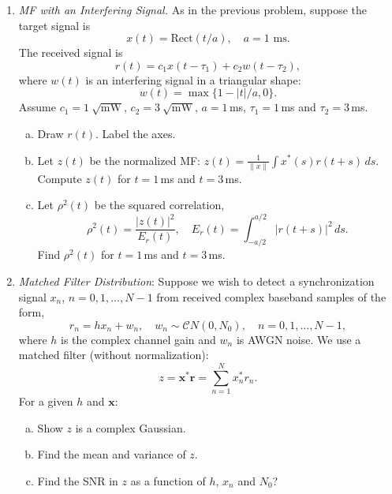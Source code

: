 \documentclass[11pt]{article}
\def\sqrtmw{\sqrt{\mathrm{mW}}}
\newcommand{\rbf}{\boldsymbol{r}}
\newcommand{\xbf}{\boldsymbol{x}}
\begin{document}
\begin{enumerate}
\item \label{prob:mf_int}
\emph{MF with an Interfering Signal.}  As in the previous problem, 
suppose the target signal is 
\[
    x(t) = \mathrm{Rect}(t/a), \quad a = 1\mbox{ ms}.
\]
The received signal is
\[
    r(t) = c_1 x(t-\tau_1) + c_2 w(t-\tau_2),
\]
where $w(t)$ is an interfering signal in a triangular shape:
\[
    w(t) = \max\{1 - |t|/a, 0\}.
\]
Assume $c_1=1~\sqrtmw$, $c_2=3~\sqrtmw$, $a=1$\,\si{ms}, $\tau_1=1$\,\si{ms} and $\tau_2=3$\,\si{ms}.
\begin{enumerate}[(a)]
\item Draw $r(t)$.  Label the axes.

\item Let $z(t)$ be the normalized MF:  $z(t)=\frac{1}{\|x\|} \int x^*(s)r(t+s)\,ds$.  Compute
$z(t)$ for $t=1$\,\si{ms} and $t=3$\,\si{ms}.

\item Let $\rho^2(t)$ be the squared correlation,
\[
    \rho^2(t) = \frac{|z(t)|^2}{E_r(t)}, \quad E_r(t) = \int_{-a/2}^{a/2} |r(t+s)|^2\,ds.
\]
Find $\rho^2(t)$ for $t=1$\,\si{ms} and $t=3$\,\si{ms}.
\end{enumerate}


\item \label{prob:mfdist} \emph{Matched Filter Distribution}:
Suppose we wish to detect a synchronization signal $x_n$, $n=0,1,\ldots,N-1$ from
received complex baseband samples of the form,
\[
    r_n = hx_n + w_n, \quad w_n \sim {\mathcal CN}(0,N_0),
    \quad n=0,1,\ldots,N-1,
\]
where $h$ is the complex channel gain and $w_n$ is AWGN noise.
We use a matched filter (without normalization):
\[
    z = \xbf^*\rbf = \sum_{n=1}^N x_n^*r_n.
\]
For a given $h$ and $\xbf$:
\begin{enumerate}[(a)]
\item Show $z$ is a complex Gaussian.
\item Find the mean and variance of $z$.
\item Find the SNR in $z$ as a function of $h$,
$x_n$ and $N_0$?
\end{enumerate}


\end{enumerate}
\end{document}
